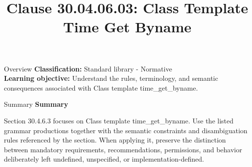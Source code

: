 \documentclass[10pt,letterpaper]{article}
\title{Clause 30.04.06.03: Class Template Time Get Byname}
\author{}
\date{}
\begin{document}
\maketitle
\begin{CornellOverviewBox}{Overview}
\textbf{Classification:} Standard library - Normative\\[2pt]
\textbf{Learning objective:} Understand the rules, terminology, and semantic consequences associated with Class template time\_get\_byname.
\end{CornellOverviewBox}\begin{CornellSummaryBox}{Summary}
{\sffamily\bfseries\color{Accent} Summary}\par\vspace{3pt}Section 30.4.6.3 focuses on Class template time\_get\_byname. Use the listed grammar productions together with the semantic constraints and disambiguation rules referenced by the section. When applying it, preserve the distinction between mandatory requirements, recommendations, permissions, and behavior deliberately left undefined, unspecified, or implementation-defined.
\end{CornellSummaryBox}
\end{document}
